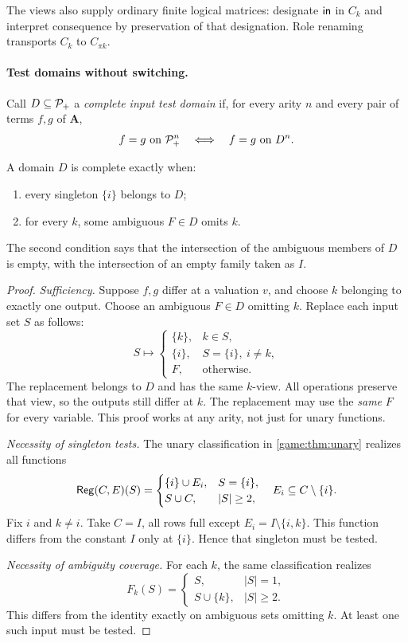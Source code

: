 The views also supply ordinary finite logical matrices: designate $\mathsf{in}$ in $C_k$ and interpret consequence by preservation of that designation. Role renaming transports $C_k$ to $C_{\pi k}$.

\paragraph{Test domains without switching.}
Call $D\subseteq\mathcal P_+$ a \emph{complete input test domain} if, for every arity $n$ and every pair of terms $f,g$ of $\mathbf A$,
\[
 f=g\text{ on }\mathcal P_+^n\quad\Longleftrightarrow\quad f=g\text{ on }D^n.
\]

\begin{proposition}\label{view:thm:tests}
A domain $D$ is complete exactly when:
\begin{enumerate}
\item every singleton $\{i\}$ belongs to $D$;
\item for every $k$, some ambiguous $F\in D$ omits $k$.
\end{enumerate}
The second condition says that the intersection of the ambiguous members
of $D$ is empty, with the intersection of an empty family taken as $I$.
\end{proposition}
\begin{proof}
\emph{Sufficiency.} Suppose $f,g$ differ at a valuation $v$, and choose
$k$ belonging to exactly one output. Choose an ambiguous $F\in D$
omitting $k$. Replace each input set $S$ as follows:
\[
 S\longmapsto
 \begin{cases}
 \{k\},&k\in S,\\
 \{i\},&S=\{i\},\ i\ne k,\\
 F,&\text{otherwise}.
 \end{cases}
\]
The replacement belongs to $D$ and has the same $k$-view. All operations
preserve that view, so the outputs still differ at $k$. The replacement
may use the \emph{same} $F$ for every variable. This proof works at any
arity, not just for unary functions.

\emph{Necessity of singleton tests.} The unary classification in \cref{game:thm:unary} realizes all functions
\[
 \mathsf{Reg}(C,E)(S)=\begin{cases}\{i\}\cup E_i,&S=\{i\},\\
 S\cup C,&|S|\geq2,\end{cases}
 \quad E_i\subseteq C\setminus\{i\}.
\]
Fix $i$ and $k\ne i$. Take $C=I$, all rows full except
$E_i=I\setminus\{i,k\}$. This function differs from the constant $I$
only at $\{i\}$. Hence that singleton must be tested.

\emph{Necessity of ambiguity coverage.} For each $k$, the same
classification realizes
\[
 F_k(S)=\begin{cases}S,&|S|=1,\\S\cup\{k\},&|S|\geq2.\end{cases}
\]
This differs from the identity exactly on ambiguous sets omitting $k$.
At least one such input must be tested.
\end{proof}


